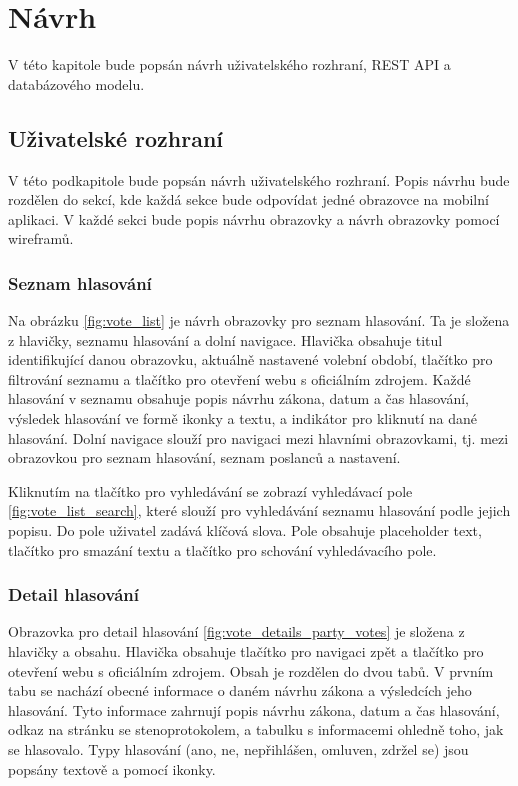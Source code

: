 \chapter{Návrh}

\begin{chapterabstract}
	V této kapitole bude popsán návrh uživatelského rozhraní, REST API a databázového modelu.
\end{chapterabstract}


\section{Uživatelské rozhraní}
V této podkapitole bude popsán návrh uživatelského rozhraní. Popis návrhu bude rozdělen do sekcí, kde každá sekce bude odpovídat jedné obrazovce na mobilní aplikaci. V každé sekci bude popis návrhu obrazovky a návrh obrazovky pomocí wireframů.

\subsection*{Seznam hlasování}
\label{ssec:design-votes}

Na obrázku \ref{fig:vote_list} je návrh obrazovky pro seznam hlasování. Ta je složena z hlavičky, seznamu hlasování a dolní navigace. Hlavička obsahuje titul identifikující danou obrazovku,  aktuálně nastavené volební období, tlačítko pro filtrování seznamu a tlačítko pro otevření webu s oficiálním zdrojem. Každé hlasování v seznamu obsahuje popis návrhu zákona, datum a čas \linebreak hlasování, výsledek hlasování ve formě ikonky a textu, a indikátor pro kliknutí na dané hlasování. Dolní navigace slouží pro navigaci mezi hlavními obrazovkami, tj. mezi obrazovkou pro seznam hlasování, seznam poslanců a nastavení.

Kliknutím na tlačítko pro vyhledávání se zobrazí vyhledávací pole \ref{fig:vote_list_search}, které slouží pro vyhledávání seznamu hlasování podle jejich popisu. Do pole uživatel zadává klíčová slova. Pole obsahuje placeholder text, tlačítko pro smazání textu a tlačítko pro schování vyhledávacího pole.%

\subsection*{Detail hlasování}
\label{ssec:design-vote}

Obrazovka pro detail hlasování \ref{fig:vote_details_party_votes} je složena z hlavičky a obsahu. Hlavička obsahuje tlačítko pro navigaci zpět a tlačítko pro otevření webu s oficiálním zdrojem. Obsah je rozdělen do dvou tabů. V prvním tabu se nachází obecné informace o daném návrhu zákona a výsledcích jeho hlasování. Tyto informace zahrnují popis návrhu zákona, datum a čas hlasování, odkaz na stránku se stenoprotokolem, a tabulku s informacemi ohledně toho, jak se hlasovalo. Typy \linebreak hlasování (ano, ne, nepřihlášen, omluven, zdržel se) jsou popsány textově a pomocí ikonky.

